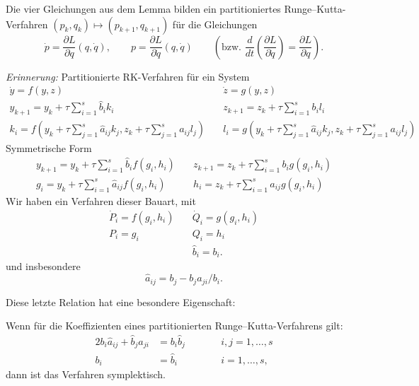 Die vier Gleichungen aus dem Lemma bilden ein partitioniertes Runge--Kutta-Verfahren
$(p_k,q_k)\mapsto(p_{k+1},q_{k+1})$ für die Gleichungen
\begin{equation*}
\dot{p}=\frac{\partial L}{\partial q}(q,\dot{q}),
\qquad
p=\frac{\partial L}{\partial \dot{q}}(q,\dot q)
\qquad
\left(\text{bzw.\ } \frac{d}{dt}\left(\frac{\partial L}{\partial \dot q}\right) = \frac{\partial L}{\partial q}\right).
\end{equation*}

\emph{Erinnerung:} Partitionierte RK-Verfahren für ein System
\begin{align*}
\dot{y}=f(y,z)\quad &\dot{z}=g(y,z) \\
y_{k+1} = y_k + \tau\sum_{i=1}^s\hat{b}_i k_i \quad &z_{k+1} = z_k + \tau\sum_{i=1}^sb_i l_i \\
 k_i = f(y_k+\tau\sum_{j=1}^s\hat{a}_{ij} k_j,z_k+\tau\sum_{j=1}^s a_{ij}l_j)
  \quad
 &l_i = g(y_k+\tau\sum_{j=1}^s\hat{a}_{ij} k_j,z_k+\tau\sum_{j=1}^s a_{ij}l_j)
\end{align*}
Symmetrische Form
\begin{align*}
y_{k+1} = y_k + \tau\sum_{i=1}^s\hat{b}_i f(g_i,h_i)\quad &z_{k+1} = z_k + \tau\sum_{i=1}^sb_i g(g_i,h_i) \\
g_i = y_k + \tau\sum_{i=1}^s\hat{a}_{ij} f(g_i,h_i)\quad &h_i = z_k + \tau\sum_{i=1}^sa_{ij} g(g_i,h_i)
\end{align*}
Wir haben ein Verfahren dieser Bauart, mit
\begin{align*}
\dot{P}_i=f(g_i,h_i)\quad &\dot{Q}_i=g(g_i,h_i)\\
P_i = g_i\quad & Q_i = h_i\\
   &\hat{b}_i = b_i.
\end{align*}
und insbesondere
\begin{equation*}
 \hat{a}_{ij}
 =
 b_j - b_j a_{ji} / b_i.
\end{equation*}

\bigskip

Diese letzte Relation hat eine besondere Eigenschaft:
\begin{satz}
 Wenn für die Koeffizienten eines partitionierten Runge--Kutta-Verfahrens gilt:
 \begin{alignat*}{2}
  b_i \hat{a}_{ij} + \hat{b}_j a_{ji} & = b_i \hat{b}_j  & \qquad & i,j = 1,\dots,s \\
  b_i & = \hat{b}_i   && i = 1,\dots,s,
 \end{alignat*}
 dann ist das Verfahren symplektisch.
\end{satz}


